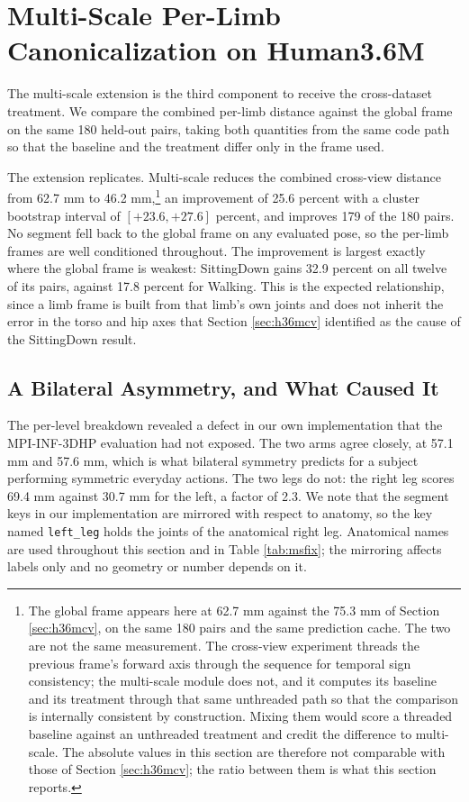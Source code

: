 \section{Multi-Scale Per-Limb Canonicalization on Human3.6M}
\label{sec:h36mms}

The multi-scale extension is the third component to receive the cross-dataset treatment. We compare the combined per-limb distance against the global frame on the same 180 held-out pairs, taking both quantities from the same code path so that the baseline and the treatment differ only in the frame used.

The extension replicates. Multi-scale reduces the combined cross-view distance from 62.7 mm to 46.2 mm,\footnote{The global frame appears here at 62.7 mm against the 75.3 mm of Section \ref{sec:h36mcv}, on the same 180 pairs and the same prediction cache. The two are not the same measurement. The cross-view experiment threads the previous frame's forward axis through the sequence for temporal sign consistency; the multi-scale module does not, and it computes its baseline and its treatment through that same unthreaded path so that the comparison is internally consistent by construction. Mixing them would score a threaded baseline against an unthreaded treatment and credit the difference to multi-scale. The absolute values in this section are therefore not comparable with those of Section \ref{sec:h36mcv}; the ratio between them is what this section reports.} an improvement of 25.6 percent with a cluster bootstrap interval of $[+23.6, +27.6]$ percent, and improves 179 of the 180 pairs. No segment fell back to the global frame on any evaluated pose, so the per-limb frames are well conditioned throughout. The improvement is largest exactly where the global frame is weakest: SittingDown gains 32.9 percent on all twelve of its pairs, against 17.8 percent for Walking. This is the expected relationship, since a limb frame is built from that limb's own joints and does not inherit the error in the torso and hip axes that Section \ref{sec:h36mcv} identified as the cause of the SittingDown result.

\subsection{A Bilateral Asymmetry, and What Caused It}

The per-level breakdown revealed a defect in our own implementation that the MPI-INF-3DHP evaluation had not exposed. The two arms agree closely, at 57.1 mm and 57.6 mm, which is what bilateral symmetry predicts for a subject performing symmetric everyday actions. The two legs do not: the right leg scores 69.4 mm against 30.7 mm for the left, a factor of 2.3. We note that the segment keys in our implementation are mirrored with respect to anatomy, so the key named \texttt{left\_leg} holds the joints of the anatomical right leg. Anatomical names are used throughout this section and in Table \ref{tab:msfix}; the mirroring affects labels only and no geometry or number depends on it.

